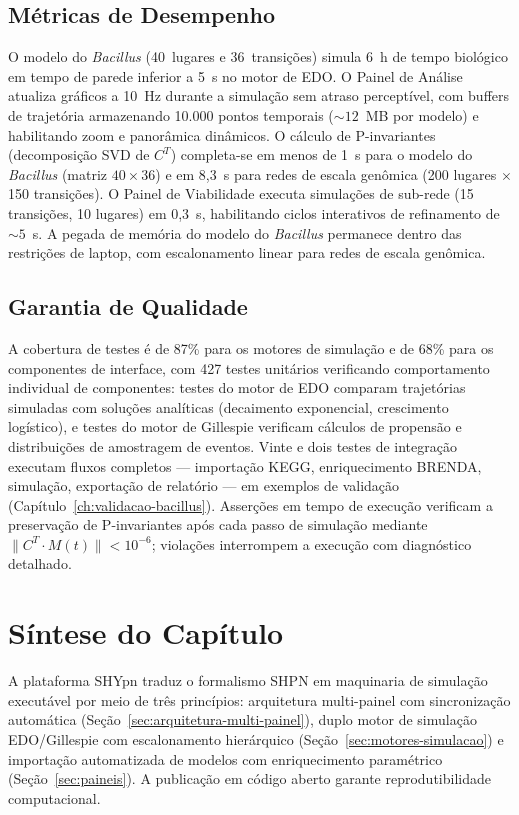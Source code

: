 \subsection{Métricas de Desempenho}

O modelo do \textit{Bacillus} (40~lugares e 36~transições) simula 6~h de
tempo biológico em tempo de parede inferior a 5~s no motor de EDO.
O Painel de Análise atualiza gráficos a 10~Hz durante a simulação sem atraso
perceptível, com buffers de trajetória armazenando 10.000 pontos temporais
($\sim\!12$~MB por modelo) e habilitando zoom e panorâmica dinâmicos.
O cálculo de P-invariantes (decomposição SVD de $C^T$) completa-se em menos de
1~s para o modelo do \textit{Bacillus} (matriz $40 \times 36$) e em 8,3~s para
redes de escala genômica (200 lugares $\times$ 150 transições).
O Painel de Viabilidade executa simulações de sub-rede (15 transições, 10 lugares)
em 0,3~s, habilitando ciclos interativos de refinamento de $\sim\!5$~s.
A pegada de memória do modelo do \textit{Bacillus} permanece dentro das
restrições de laptop, com escalonamento linear para redes de escala genômica.

\subsection{Garantia de Qualidade}

A cobertura de testes é de 87\% para os motores de simulação e de 68\% para
os componentes de interface, com 427 testes unitários verificando comportamento
individual de componentes: testes do motor de EDO comparam trajetórias simuladas
com soluções analíticas (decaimento exponencial, crescimento logístico), e
testes do motor de Gillespie verificam cálculos de propensão e distribuições de
amostragem de eventos.
Vinte e dois testes de integração executam fluxos completos — importação KEGG,
enriquecimento BRENDA, simulação, exportação de relatório — em exemplos de
validação (Capítulo~\ref{ch:validacao-bacillus}).
Asserções em tempo de execução verificam a preservação de P-invariantes após
cada passo de simulação mediante $\|C^T \cdot M(t)\| < 10^{-6}$; violações
interrompem a execução com diagnóstico detalhado.

\section{Síntese do Capítulo}
\label{sec:sintese-implementacao}

A plataforma SHYpn traduz o formalismo SHPN em maquinaria de simulação
executável por meio de três princípios: arquitetura multi-painel com
sincronização automática (Seção~\ref{sec:arquitetura-multi-painel}),
duplo motor de simulação EDO/Gillespie com escalonamento hierárquico
(Seção~\ref{sec:motores-simulacao}) e importação automatizada de modelos
com enriquecimento paramétrico (Seção~\ref{sec:paineis}).
A publicação em código aberto garante reprodutibilidade computacional.
